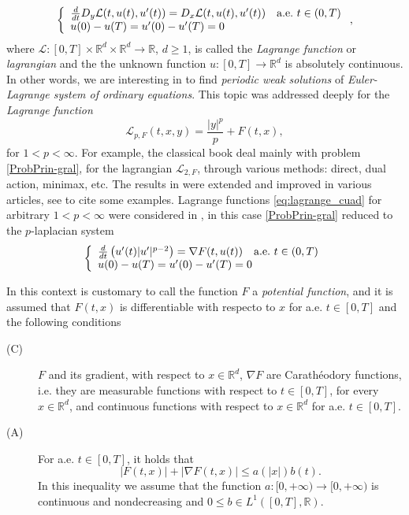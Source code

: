 \documentclass[twoside]{article}
\theoremstyle{remark}
\newcommand{\rr}{\mathbb{R}}
\renewcommand{\leq}{\leqslant}
\renewcommand{\geq}{\geqslant}
\newcounter{example}
\begin{document}
\begin{equation}\label{ProbPrin-gral}
    \left\{%
\begin{array}{ll}
  \frac{d}{dt} D_{y}\mathcal{L}(t,u(t),u'(t))= D_{x}\mathcal{L}(t,u(t),u'(t)) \quad \hbox{a.e.}\ t \in (0,T)\\
    u(0)-u(T)=u'(0)-u'(T)=0
\end{array}%
\right.,
\end{equation}
where $\mathcal{L}:[0,T]\times\rr^d\times\rr^d\to\rr$, $d\geq 1$, is called the \emph{Lagrange function} or \emph{lagrangian} and the the unknown function  $u:[0,T]\to\rr^d$ is absolutely continuous. In other words, we are interesting in to find \emph{periodic weak solutions} of \emph{Euler-Lagrange system of ordinary equations}. This topic    was addressed deeply for the \emph{Lagrange function}
\begin{equation}\label{eq:lagrange_cuad}
\mathcal{L}_{p,F}(t,x,y)=\frac{|y|^p}{p}+F(t,x),
\end{equation}
for $1<p<\infty$. For example, the classical book  \cite{mawhin2010critical} deal mainly with problem \eqref{ProbPrin-gral}, for the lagrangian $\mathcal{L}_{2,F}$, through various methods: direct, dual action, minimax, etc. The results in \cite{mawhin2010critical} were extended and improved in various articles, see  \cite{tang1995periodic,tang1998periodic,wu1999periodic,tang2001periodic,zhao2004periodic}  to cite some examples. Lagrange functions \eqref{eq:lagrange_cuad} for arbitrary $1<p<\infty$ were considered in  \cite{Tian2007192,tang2010periodic}, in this case \eqref{ProbPrin-gral} reduced to the $p$-laplacian system
\begin{equation}\label{ProbP-lapla}
    \left\{%
\begin{array}{ll}
   \frac{d}{dt}\left(u'(t)|u'|^{p-2}\right) = \nabla F(t,u(t)) \quad \hbox{a.e.}\ t \in (0,T)\\
    u(0)-u(T)=u'(0)-u'(T)=0
\end{array}%
\right.
\end{equation}


In this context  is customary to call the function $F$ a  \emph{potential function}, and it is assumed that $F(t,x)$ is differentiable with respecto to $x$ for a.e. $t\in [0,T]$ and the following conditions
\begin{description}

 \item[(C)]\label{item:condicion_c} $F$ and its gradient, with respect to $x\in\rr^d$, $\nabla F$ are  Carath\'eodory functions, i.e. they are measurable functions with respect to $t\in [0,T]$, for every  $x\in\rr^d$, and   continuous functions with  respect to  $x\in\rr^d$ for a.e. $t \in [0,T]$.

 \item[(A)]\label{item:condicion_a}  For   a.e. $t\in [0,T]$, it holds that
\begin{equation}
|F(t,x)| + |\nabla F(t,x)|  \leq a(|x|)b(t).
\end{equation}
In this inequality we assume that the function  $a:[0,+\infty)\to [0,+\infty)$ is continuous and nondecreasing and $0\leq b\in L^1([0,T],\rr)$.
\end{description}
\end{document}
